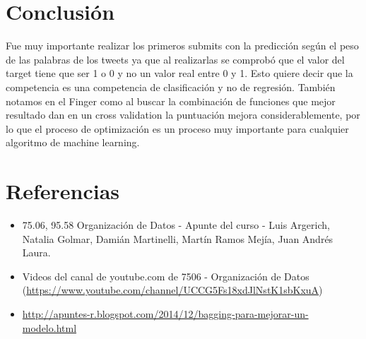 \documentclass[12pt]{article}
\begin{document}
\newpage
\section{Conclusión}
Fue muy importante realizar los primeros submits con la predicción según el peso de las palabras de los tweets ya que al realizarlas se comprobó que el valor del target tiene que ser 1 o 0 y no un valor real entre 0 y 1. Esto quiere decir que la competencia es una competencia de clasificación y no de regresión.
También notamos en el Finger como al buscar la combinación de funciones que mejor resultado dan en un cross validation la puntuación mejora considerablemente, por lo que el proceso de optimización es un proceso muy importante para cualquier algoritmo de machine learning.



\newpage
\section{Referencias}
\begin{itemize}
  \item 75.06, 95.58 Organización de Datos - Apunte del curso - Luis Argerich, Natalia Golmar, Damián Martinelli, Martín Ramos Mejía, Juan Andrés Laura.
  \item Videos del canal de youtube.com de 7506 - Organización de Datos (\url{https://www.youtube.com/channel/UCCG5Fs18xdJlNstK1sbKxuA})
  \item \url{http://apuntes-r.blogspot.com/2014/12/bagging-para-mejorar-un-modelo.html}
\end{itemize}
\end{document}
